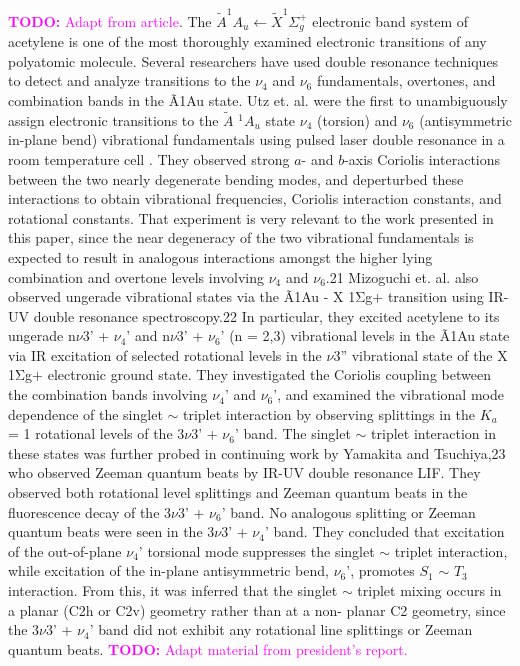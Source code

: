 \documentclass[12pt,draft]{mitthesis}
\newcommand{\TODO} [1]{\textcolor{magenta}{\textbf{TODO:} #1}}
\newcommand{\POINT}[1]{\textcolor{magenta}{#1}}
\begin{document}
\TODO{Adapt from article}.  The $\tilde{A} ^1A_u \leftarrow \tilde{X}
^1\Sigma_g^+$ electronic band system of acetylene is one of the most
thoroughly examined electronic transitions of any polyatomic molecule.
Several researchers have used double resonance techniques to detect
and analyze transitions to the $\nu_4$ and $\nu_6$ fundamentals,
overtones, and combination bands in the Ã1Au state. Utz et. al. were
the first to unambiguously assign electronic transitions to the
$\tilde{A}$ $^1A_u$ state $\nu_4$ (torsion) and $\nu_6$ (antisymmetric
in-plane bend) vibrational fundamentals using pulsed laser double
resonance in a room temperature cell \cite{utz93}.  They observed
strong $a$- and $b$-axis Coriolis interactions between the two nearly
degenerate bending modes, and deperturbed these interactions to obtain
vibrational frequencies, Coriolis interaction constants, and
rotational constants.  That experiment is very relevant to the work
presented in this paper, since the near degeneracy of the two
vibrational fundamentals is expected to result in analogous
interactions amongst the higher lying combination and overtone levels
involving $\nu_4$ and $\nu_6$.21 Mizoguchi et. al. also observed
ungerade vibrational states via the Ã1Au - X 1Σg+ transition using
IR-UV double resonance spectroscopy.22 In particular, they excited
acetylene to its ungerade n$\nu$3' + $\nu_4$' and n$\nu$3' + $\nu_6$'
(n = 2,3) vibrational levels in the Ã1Au state via IR excitation of
selected rotational levels in the $\nu$3” vibrational state of the X
1Σg+ electronic ground state.  They investigated the Coriolis coupling
between the combination bands involving $\nu_4$' and $\nu_6$', and
examined the vibrational mode dependence of the singlet $\sim$ triplet
interaction by observing splittings in the $K_a$ = 1 rotational levels
of the 3$\nu$3' + $\nu_6$' band. The singlet $\sim$ triplet
interaction in these states was further probed in continuing work by
Yamakita and Tsuchiya,23 who observed Zeeman quantum beats by IR-UV
double resonance LIF. They observed both rotational level splittings
and Zeeman quantum beats in the fluorescence decay of the 3$\nu$3' +
$\nu_6$' band.  No analogous splitting or Zeeman quantum beats were
seen in the 3$\nu$3' + $\nu_4$' band. They concluded that excitation
of the out-of-plane $\nu_4$' torsional mode suppresses the singlet
$\sim$ triplet interaction, while excitation of the in-plane
antisymmetric bend, $\nu_6$', promotes $S_1$ $\sim$ $T_3$
interaction. From this, it was inferred that the singlet $\sim$
triplet mixing occurs in a planar (C2h or C2v) geometry rather than at
a non- planar C2 geometry, since the 3$\nu$3' + $\nu_4$' band did not
exhibit any rotational line splittings or Zeeman quantum beats.
\TODO{Adapt material from president's report.}
\end{document}
